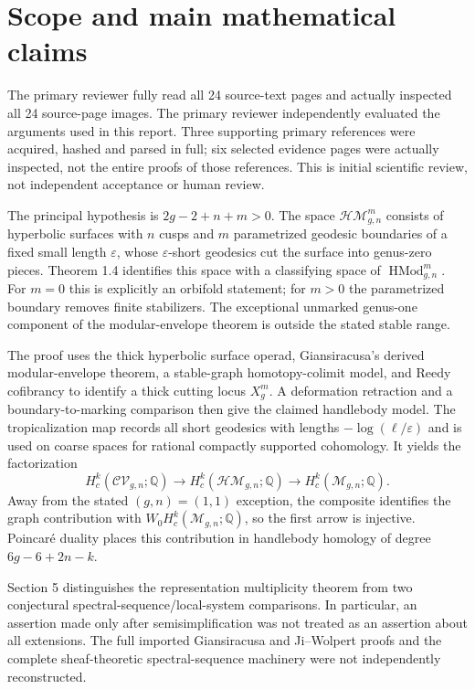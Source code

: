 \documentclass[10pt]{article}
\begin{document}
\section*{Scope and main mathematical claims}
The primary reviewer fully read all 24 source-text pages and actually inspected all 24 source-page images. The primary reviewer independently evaluated the arguments used in this report. Three supporting primary references were acquired, hashed and parsed in full; six selected evidence pages were actually inspected, not the entire proofs of those references. This is initial scientific review, not independent acceptance or human review.\par
The principal hypothesis is \(2g-2+n+m>0\). The space \(\mathcal{HM}^m_{g,n}\) consists of hyperbolic surfaces with \(n\) cusps and \(m\) parametrized geodesic boundaries of a fixed small length \(\varepsilon\), whose \(\varepsilon\)-short geodesics cut the surface into genus-zero pieces. Theorem 1.4 identifies this space with a classifying space of \(\operatorname{HMod}^m_{g,n}\). For \(m=0\) this is explicitly an orbifold statement; for \(m>0\) the parametrized boundary removes finite stabilizers. The exceptional unmarked genus-one component of the modular-envelope theorem is outside the stated stable range.\par
The proof uses the thick hyperbolic surface operad, Giansiracusa’s derived modular-envelope theorem, a stable-graph homotopy-colimit model, and Reedy cofibrancy to identify a thick cutting locus \(X^m_g\). A deformation retraction and a boundary-to-marking comparison then give the claimed handlebody model. The tropicalization map records all short geodesics with lengths \(-\log(\ell/\varepsilon)\) and is used on coarse spaces for rational compactly supported cohomology. It yields the factorization \[H_c^k(\mathcal{CV}_{g,n};\mathbb Q)\longrightarrow
 H_c^k(\mathcal{HM}_{g,n};\mathbb Q)\longrightarrow H_c^k(\mathcal M_{g,n};\mathbb Q).\] Away from the stated \((g,n)=(1,1)\) exception, the composite identifies the graph contribution with \(W_0H_c^k(\mathcal M_{g,n};\mathbb Q)\), so the first arrow is injective. Poincaré duality places this contribution in handlebody homology of degree \(6g-6+2n-k\).\par
Section 5 distinguishes the representation multiplicity theorem from two conjectural spectral-sequence/local-system comparisons. In particular, an assertion made only after semisimplification was not treated as an assertion about all extensions. The full imported Giansiracusa and Ji–Wolpert proofs and the complete sheaf-theoretic spectral-sequence machinery were not independently reconstructed.\par
\end{document}
